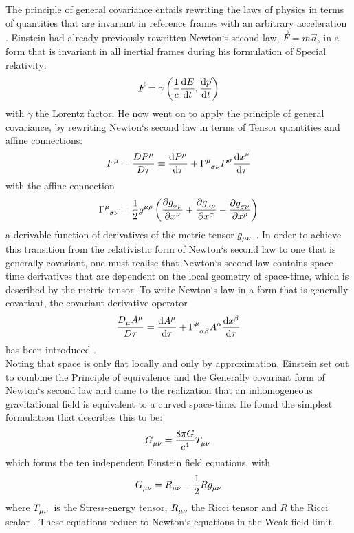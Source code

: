\documentclass[a4paper, 11pt]{FSKH_623_Report}
\numberwithin{equation}{section}
\begin{document}
The principle of general covariance entails rewriting the laws of physics in terms of quantities that are invariant in reference frames with an arbitrary acceleration \citep{ITC}. Einstein had already previously rewritten Newton`s second law, $\vec{F}=m\vec{a}$, in a form that is invariant in all inertial frames during his formulation of Special relativity: $$\vec{F}=\gamma\left(\frac{1}{c}\dv{E}{t},\dv{\vec{p}}{t}\right)$$with $\gamma$ the Lorentz factor. He now went on to apply the principle of general covariance, by rewriting Newton`s second law in terms of Tensor quantities and affine connections: $$\tensor{F}{^\mu}=\frac{D\tensor{P}{^\mu}}{D\tau}\equiv\dv{\tensor{P}{^\mu}}{\tau}+\tensor{\Gamma}{^\mu_{\sigma\nu}}\tensor{P}{^\sigma}\dv{\tensor{x}{^\nu}}{\tau}$$ with the affine connection $$\tensor{\Gamma}{^\mu_{\sigma\nu}}=\frac{1}{2}\tensor{g}{^{\mu\rho}}\left(\pdv{\tensor{g}{_{\sigma\rho}}}{x^\nu}+\pdv{\tensor{g}{_{\nu\rho}}}{x^\sigma}-\pdv{\tensor{g}{_{\sigma\nu}}}{x^\rho}\right)$$ a derivable function of derivatives of the metric tensor $\tensor{g}{_{\mu\nu}}$ \citep{ITC}. In order to achieve this transition from the relativistic form of Newton`s second law to one that is generally covariant, one must realise that Newton`s second law contains space-time derivatives that are dependent on the local geometry of space-time, which is described by the metric tensor. To write Newton`s law in a form that is generally covariant, the covariant derivative operator $$\frac{\tensor{D}{_\mu}\tensor{A}{^\mu}}{D\tau}=\dv{\tensor{A}{^\mu}}{\tau}+\tensor{\Gamma}{^\mu_{\alpha\beta}}\tensor{A}{^\alpha}\dv{\tensor{x}{^{\beta}}}{\tau}$$ has been introduced \citep{GRFD}. \\ 
Noting that space is only flat locally and only by approximation, Einstein set out to combine the Principle of equivalence and the Generally covariant form of Newton`s second law and came to the realization that an inhomogeneous gravitational field is equivalent to a curved space-time. He found the simplest formulation that describes this to be:
$$\tensor{G}{_{\mu\nu}}=\frac{8\pi G}{c^{4}}\tensor{T}{_{\mu\nu}}$$
which forms the ten independent Einstein field equations, with 
$$\tensor{G}{_{\mu\nu}}=\tensor{R}{_{\mu\nu}}-\frac{1}{2}R\tensor{g}{_{\mu\nu}}$$ where $\tensor{T}{_{\mu\nu}}$ is the Stress-energy tensor, $\tensor{R}{_{\mu\nu}}$ the Ricci tensor and $R$ the Ricci scalar \citep{ITC}. These equations reduce to Newton`s equations in the Weak field limit.
\end{document}
